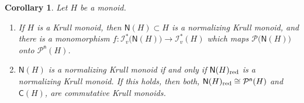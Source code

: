 \documentclass[a4paper]{amsart}
\newtheorem{corollary}[theorem]{Corollary}
\theoremstyle{definition}
\numberwithin{equation}{section}
\begin{document}
\medskip
\begin{corollary} \label{4.14}
Let $H$ be a  monoid.
\begin{enumerate}
\item If $H$ is a Krull monoid, then $\mathsf N (H) \subset H$ is a normalizing Krull monoid, and
      there is a monomorphism $f \colon \mathcal I_v^* \big( \mathsf N (H) \big)
      \to \mathcal I_v^* (H)$ which maps $\mathcal P \big( \mathsf N (H) \big)$ onto $\mathcal P^{\mathsf n} (H)$.

\smallskip
\item $\mathsf N (H)$ is a normalizing Krull monoid if and only if $\mathsf N (H)_{{\text{\rm red}}}$ is a normalizing
      Krull monoid. If this holds, then both, $\mathsf N (H)_{{\text{\rm red}}} \cong \mathcal P^{\mathsf n} (H)$ and $\mathsf C (H)$, are
      commutative Krull monoids.
\end{enumerate}
\end{corollary}
\end{document}
